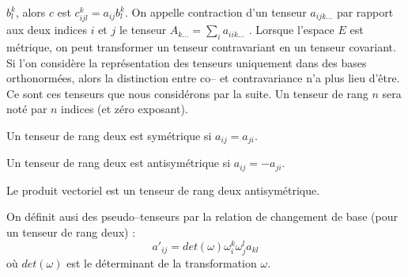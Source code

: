 \documentclass[12pt]{book}
\begin{document}
$b^k_l$, alors $c$ est $c_{ijl}^k=a_{ij}b^k_l$.
On appelle contraction d'un tenseur $a_{ijk\dots}$ par rapport aux
deux indices $i$ et $j$ le tenseur $A_{k\dots}=\sum_ia_{iik\dots}$
\cite{ma:tense:Brillouin38,ma:tense:Bass64}.
Lorsque l'espace $E$ est m\'etrique, on peut transformer un tenseur
contravariant en un tenseur covariant.
Si l'on consid\`ere la repr\'esentation des tenseurs uniquement dans
des bases orthonorm\'ees, alors la distinction entre co-- et
contravariance n'a plus lieu d'\^etre. Ce sont ces tenseurs que nous
consid\'erons par la suite. Un tenseur de rang $n$ sera not\'e par
$n$ indices (et z\'ero exposant).
\begin{defn}
Un tenseur de rang deux est sym\'etrique si $a_{ij}=a_{ji}$.
\end{defn}
\begin{defn}
Un tenseur de rang deux est antisym\'etrique si $a_{ij}=-a_{ji}$.
\end{defn}
\begin{exmp}
Le produit vectoriel est un tenseur de rang deux antisym\'etrique.
\end{exmp}
\begin{rem}
On d\'efinit ausi des pseudo--tenseurs \cite{ma:tense:Bass64} par la relation
de changement 
de base (pour un tenseur de rang deux) :
\begin{equation}
a'_{ij}=det(\omega)\omega^k_i\omega^l_j a_{kl}
\end{equation}
o\`u $det(\omega)$ est le d\'eterminant de la transformation
 $\omega$.
\end{rem}
\end{document}
